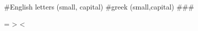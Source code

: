 #English letters (small, capital)
#greek (small,capital)
\alpha \beta \theta \sigma
\Alpha \Beta \Theta \Sigma
###

\implies \leftarrow \rightarrow \leftrightrrow
\iff

\vee \wedge

\forall \exists \neg

\in \subset \subseteq \supset \supseteq



=
\geq
\leq
>
<
\approx



\sum %
\mapsto



\aleph
\nabla
\dag
\hbar
\imath

\Re \Im
\partial

